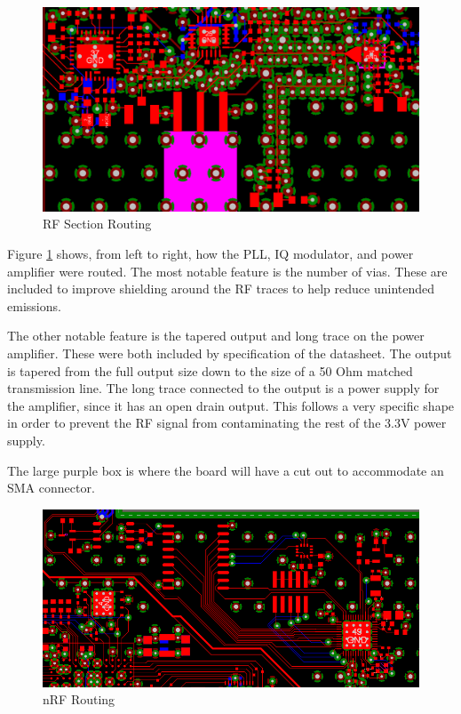 \documentclass[crop=false]{standalone}
\begin{document}
        \pagebreak
        
        \begin{figure}[H]
            \centering
            \includegraphics[width=\textwidth]{M2RBModAmpPLLRoute.PNG}
            \caption{RF Section Routing}
            \label{fig:M2RBModAmpPLL}
        \end{figure}
        
        Figure \ref{fig:M2RBModAmpPLL} shows, from left to right, how the PLL, IQ modulator, and power amplifier were routed. The most notable feature is the number of vias. These are included to improve shielding around the RF traces to help reduce unintended emissions.
        
        The other notable feature is the tapered output and long trace on the power amplifier. These were both included by specification of the datasheet. The output is tapered from the full output size down to the size of a 50 Ohm matched transmission line. The long trace connected to the output is a power supply for the amplifier, since it has an open drain output. This follows a very specific shape in order to prevent the RF signal from contaminating the rest of the 3.3V power supply.
        
        The large purple box is where the board will have a cut out to accommodate an SMA connector.
        
        \pagebreak
        
        \begin{figure}[H]
            \centering
            \includegraphics[width=\textwidth]{M2RBnRFRoute.PNG}
            \caption{nRF Routing}
            \label{fig:M2RBnRFRoute}
        \end{figure}
        
\end{document}
